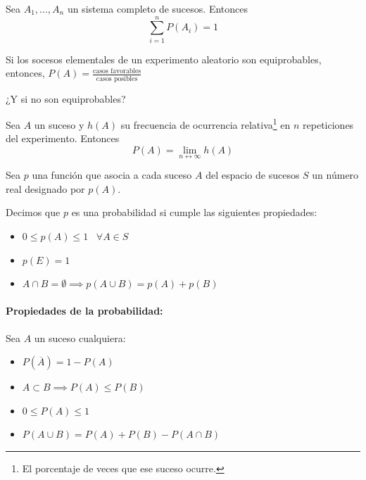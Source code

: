 \begin{prop}Sea $A_1,...,A_n$ un sistema completo de sucesos. Entonces \[\displaystyle\sum_{i=1}^n P(A_i) = 1\]
\end{prop}


\begin{defn}
Si los socesos elementales de un experimento aleatorio son equiprobables, entonces, $P(A) = \frac{\text{casos favorables}}{\text{casos posibles}}$
\end{defn}
\obs ¿Y si no son equiprobables? 

\begin{defn}
Sea $A$ un suceso y $h(A)$ su frecuencia de ocurrencia relativa\footnote{El porcentaje de veces que ese suceso ocurre.} en $n$ repeticiones del experimento. Entonces \[P(A) = \lim_{n\leftrightarrow \infty}h(A)\]
\end{defn}


\begin{defn}
    Sea $p$ una función que asocia a cada suceso $A$ del espacio de sucesos $S$ un número real designado por $p(A)$.
    
    Decimos que $p$ es una probabilidad si cumple las siguientes propiedades:
    \begin{itemize}
        \item $0\leq p(A) \leq 1 \;\;\;\forall A\in S$
        \item $p(E) = 1$
        \item $A\cap B = \emptyset \implies p(A\cup B) = p(A) + p(B)$
    \end{itemize}
\end{defn}

\paragraph{Propiedades de la probabilidad:} Sea $A$ un suceso cualquiera:
\begin{itemize}
    \item $P(\overline{A}) = 1 - P(A)$
    \item $A\subset B \implies P(A) \leq P(B)$
    \item $0\leq P(A) \leq 1$
    \item $P(A\cup B) = P(A) + P(B) - P(A\cap B)$
\end{itemize}

